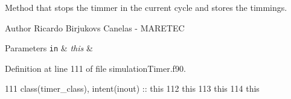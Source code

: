 Method that stops the timmer in the current cycle and stores the timmings. 

\begin{DoxyAuthor}{Author}
Ricardo Birjukovs Canelas -\/ M\+A\+R\+E\+T\+EC 
\end{DoxyAuthor}

\begin{DoxyParams}[1]{Parameters}
\mbox{\tt in}  & {\em this} & \\
\hline
\end{DoxyParams}


Definition at line 111 of file simulation\+Timer.\+f90.


\begin{DoxyCode}
111     class(timer\_class), \textcolor{keywordtype}{intent(inout)} :: this
112     this%
113     this%
114     this%
\end{DoxyCode}
